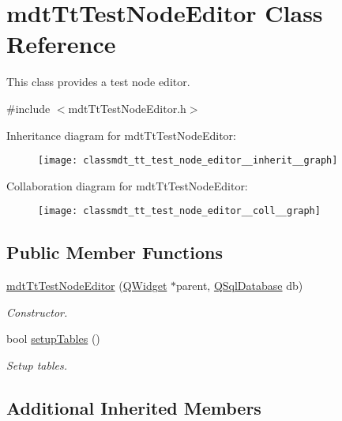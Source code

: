 \hypertarget{classmdt_tt_test_node_editor}{\section{mdt\-Tt\-Test\-Node\-Editor Class Reference}
\label{classmdt_tt_test_node_editor}
}


This class provides a test node editor.  




{\ttfamily \#include $<$mdt\-Tt\-Test\-Node\-Editor.\-h$>$}



Inheritance diagram for mdt\-Tt\-Test\-Node\-Editor\-:\nopagebreak
\begin{figure}[H]
\begin{center}
\leavevmode
\texttt{[image: classmdt\_tt\_test\_node\_editor\_\_inherit\_\_graph]}
\end{center}
\end{figure}


Collaboration diagram for mdt\-Tt\-Test\-Node\-Editor\-:\nopagebreak
\begin{figure}[H]
\begin{center}
\leavevmode
\texttt{[image: classmdt\_tt\_test\_node\_editor\_\_coll\_\_graph]}
\end{center}
\end{figure}
\subsection*{Public Member Functions}
\begin{DoxyCompactItemize}
\item 
\hyperlink{classmdt_tt_test_node_editor_ad386179f526dbeefda020d4c209d14a7}{mdt\-Tt\-Test\-Node\-Editor} (\hyperlink{class_q_widget}{Q\-Widget} $\ast$parent, \hyperlink{class_q_sql_database}{Q\-Sql\-Database} db)
\begin{DoxyCompactList}\small\item\em Constructor. \end{DoxyCompactList}\item 
bool \hyperlink{classmdt_tt_test_node_editor_ac8f144b6fb17a2dd6eec9eae7a824b6b}{setup\-Tables} ()
\begin{DoxyCompactList}\small\item\em Setup tables. \end{DoxyCompactList}\end{DoxyCompactItemize}
\subsection*{Additional Inherited Members}



